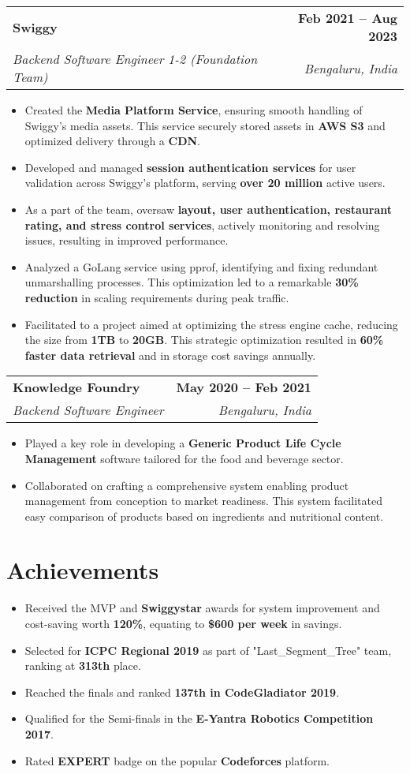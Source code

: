 \documentclass[letterpaper,11pt]{article}
\makeatletter
\newcommand{\resumeItem}[1]{
  \item\small{
    {#1 \vspace{-2pt}}
  }
}
\newcommand{\resumeSubheading}[4]{
  \vspace{-2pt}\item
    \begin{tabular*}{1.0\textwidth}[t]{l@{\extracolsep{\fill}}r}
      \textbf{#1} & \textbf{\small #2} \\
      \textit{\small#3} & \textit{\small #4} \\
    \end{tabular*}\vspace{-7pt}
}
\newcommand{\resumeSubHeadingListEnd}{\end{itemize}}
\newcommand{\resumeItemListStart}{\begin{itemize}}
\newcommand{\resumeItemListEnd}{\end{itemize}\vspace{-5pt}}
\makeatother
\begin{document}
\resumeSubheading
{Swiggy}{Feb 2021 -- Aug 2023}
{Backend Software Engineer 1-2 (Foundation Team)}{Bengaluru, India}
\resumeItemListStart
\resumeItem {Created the \textbf{Media Platform Service}, ensuring smooth handling of Swiggy's media assets. This service securely stored assets in \textbf{AWS S3} and optimized delivery through a \textbf{CDN}.}
\resumeItem{Developed and managed \textbf{session authentication services} for user validation across Swiggy's platform, serving \textbf{over 20 million} active users.}
\resumeItem {As a part of the team, oversaw \textbf{layout, user authentication, restaurant rating, and stress control services}, actively monitoring and resolving issues, resulting in improved performance.}
\resumeItem{Analyzed a GoLang service using pprof, identifying and fixing redundant unmarshalling processes. This optimization led to a remarkable \textbf{30\% reduction} in scaling requirements during peak traffic.}

\resumeItem {Facilitated to a project aimed at optimizing the stress engine cache, reducing the size from \textbf{1TB} to \textbf{20GB}. This strategic optimization resulted in \textbf{60\% faster data retrieval} and in storage cost savings annually.}

\resumeItemListEnd

\resumeSubheading
{Knowledge Foundry}{May 2020 -- Feb 2021}
{Backend Software Engineer}{Bengaluru, India}
\resumeItemListStart
\resumeItem{Played a key role in developing a \textbf{Generic Product Life Cycle Management} software tailored for the food and beverage sector.}
\resumeItem {Collaborated on crafting a comprehensive system enabling product management from conception to market readiness. This system facilitated easy comparison of products based on ingredients and nutritional content.}
    
  \resumeSubHeadingListEnd
\vspace{-10pt}
\section{Achievements}
\resumeItemListStart[itemsep=-1pt]
   \resumeItem{Received the MVP and \textbf{Swiggystar} awards for system improvement and cost-saving worth \textbf{120\%}, equating to \textbf{\$600 per week} in savings.}
    \resumeItem{Selected for \textbf{ICPC Regional 2019} as part of "Last\_Segment\_Tree" team, ranking at \textbf{313th} place.}
    \resumeItem{Reached the finals and ranked \textbf{137th in CodeGladiator 2019}.}
    \resumeItem{Qualified for the Semi-finals in the \textbf{E-Yantra Robotics Competition 2017}.}
    \resumeItem{Rated \textbf{EXPERT} badge on the popular \textbf{Codeforces} platform.}
\resumeItemListEnd
\vspace{-10pt}
\end{document}
